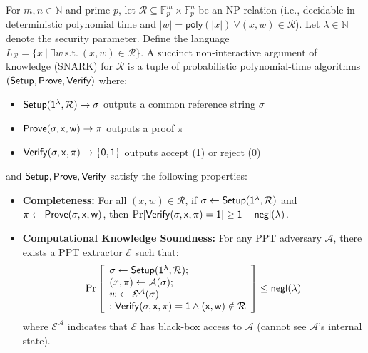 \begin{definition}\label{def:snark}
    \noindent For $m, n \in \mathbb{N}$ and prime $p$, let $\mathcal{R} \subseteq \mathbb{F}_p^{m} \times \mathbb{F}_p^{n}$ be an NP relation (i.e., decidable in deterministic polynomial time and $|w| = \mathsf{poly}(|x|)\ \forall (x, w) \in \mathcal{R}$). Let $\lambda \in \mathbb{N}$ denote the security parameter. Define the language $L_\mathcal{R} = \{x\ |\ \exists w\ \text{s.t.}\ (x, w) \in \mathcal{R}\}$. A succinct non-interactive argument of knowledge (SNARK) for $\mathcal{R}$ is a tuple of probabilistic polynomial-time algorithms $(\sf{Setup}, \sf{Prove}, \sf{Verify})$ where:
\begin{itemize}
    \item $\sf{Setup}(1^{\lambda}, \mathcal{R}) \rightarrow \sigma$ outputs a common reference string $\sigma$
    \item $\sf{Prove}(\sigma, x, w) \rightarrow \pi$ outputs a proof $\pi$
    \item $\sf{Verify}(\sigma, x, \pi) \rightarrow \{0, 1\}$ outputs accept (1) or reject (0)
\end{itemize}

\noindent and $\sf{Setup}, \sf{Prove}, \sf{Verify}$ satisfy the following properties:
\begin{itemize}
    \item \textbf{Completeness:} For all $(x, w) \in \mathcal{R}$, if $\sigma \leftarrow \sf{Setup}(1^{\lambda}, \mathcal{R})$ and $\pi \leftarrow \sf{Prove}(\sigma, x, w)$, then $\Pr[\sf{Verify}(\sigma, x, \pi) = 1] \geq 1 - \mathsf{negl}(\lambda)$.
    
    \item \textbf{Computational Knowledge Soundness:} For any PPT adversary $\mathcal{A}$, there exists a PPT extractor $\mathcal{E}$ such that:
    \begin{align*}
    \Pr\left[\begin{array}{l}
    \sigma \leftarrow \sf{Setup}(1^{\lambda}, \mathcal{R}); \\
    (x, \pi) \leftarrow \mathcal{A}(\sigma); \\
    w \leftarrow \mathcal{E}^{\mathcal{A}}(\sigma) \\
    : \sf{Verify}(\sigma, x, \pi) = 1 \land (x, w) \notin \mathcal{R}
    \end{array}\right] \leq \mathsf{negl}(\lambda)
    \end{align*}
        where $\mathcal{E}^{\mathcal{A}}$ indicates that $\mathcal{E}$ has black-box access to $\mathcal{A}$ (cannot see $\mathcal{A}$'s internal state).
    

\end{itemize}
\end{definition}
